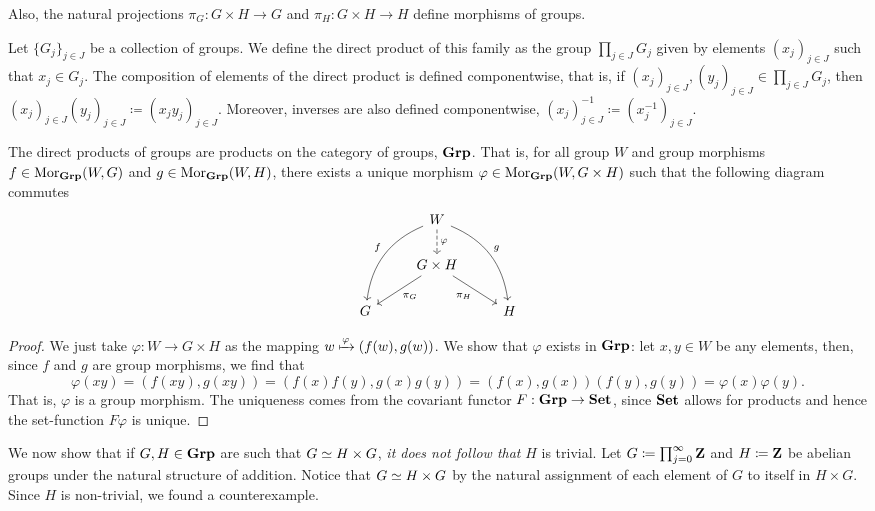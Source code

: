 Also, the natural projections \(\pi_G: G \times H \to G\) and \(\pi_H: G \times
H \to H\) define morphisms of groups.

\begin{definition}
Let \(\{G_{j}\}_{j \in J}\) be a collection of groups. We define the direct
product of this family as the group \(\prod_{j \in J} G_j\) given by elements
\((x_j)_{j \in J}\) such that \(x_j \in G_j\). The composition of elements of
the direct product is defined componentwise, that is, if \((x_j)_{j \in J},
(y_j)_{j \in J} \in \prod_{j \in J} G_j\), then \((x_j)_{j \in J} (y_j)_{j \in
J} \coloneq (x_j y_j)_{j \in J}\). Moreover, inverses are also defined
componentwise, \((x_j)_{j \in J}^{-1} \coloneq (x_j^{-1})_{j \in J}\).
\end{definition}

\begin{proposition}
The direct products of groups are products on the category of groups,
\({\textbf{Grp}}\). That is, for all group \(W\) and group morphisms \(f \in
\operatorname{Mor}_{\textbf{Grp}}(W, G)\) and \(g \in \operatorname{Mor}_{\textbf{Grp}}(W, H)\), there exists a unique
morphism \(\varphi \in \operatorname{Mor}_{\textbf{Grp}}(W, G \times H)\) such that the following
diagram commutes
\[
  \begin{tikzcd}
    &W
    \ar[d, dashed, "\varphi"]
    \ar[ddr, bend left, "g"]
    \ar[ddl, swap, bend right, "f"]
    & \\
    &G \times H \ar[dr, swap, "\pi_H"] \ar[dl, "\pi_G"] & \\
    G & &H
  \end{tikzcd}
\]
\end{proposition}

\begin{proof}
We just take \(\varphi: W \to G \times H\) as the mapping \(w \xmapsto \varphi
(f(w), g(w))\). We show that \(\varphi\) exists in \({\textbf{Grp}}\): let \(x, y \in
W\) be any elements, then, since \(f\) and \(g\) are group morphisms, we find
that
\[
  \varphi(xy) = (f(xy), g(xy)) = (f(x) f(y), g(x) g(y))
  = (f(x), g(x)) (f(y), g(y)) = \varphi(x) \varphi(y).
\]
That is, \(\varphi\) is a group morphism. The uniqueness comes from the
covariant functor \(F: {\textbf{Grp}} \to {\textbf{Set}}\), since \({\textbf{Set}}\) allows for products and
hence the set-function \(F \varphi\) is unique.
\end{proof}

\begin{remark}
We now show that if \(G, H \in {\textbf{Grp}}\) are such that \(G \simeq H \times G\),
\emph{it does not follow that} \(H\) is trivial.
Let \(G \coloneq \prod_{j=0}^{\infty} \mathbf{Z}\) and \(H \coloneq \mathbf{Z}\) be abelian
groups under the natural structure of addition. Notice that \(G \simeq H \times
G\) by the natural assignment of each element of \(G\) to itself in \(H \times
G\). Since \(H\) is non-trivial, we found a counterexample.
\end{remark}

